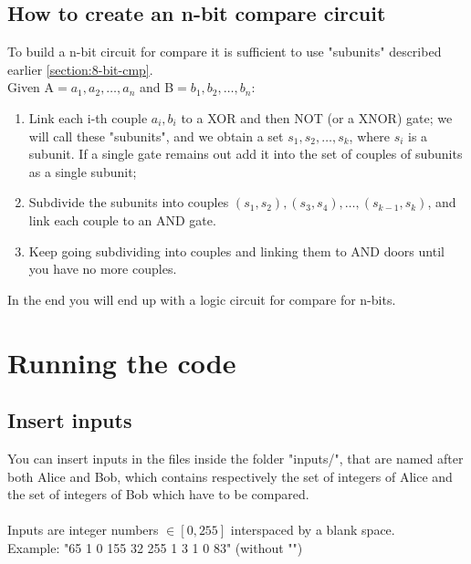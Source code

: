 \documentclass[12pt, letterpaper]{article}
\begin{document}
\subsection{How to create an n-bit compare circuit}
To build a n-bit circuit for compare it is sufficient to use "subunits" described earlier \ref{section:8-bit-cmp}.\\
Given A$=a_1,a_2,\dots,a_n$ and B$=b_1,b_2,\dots,b_n$:
\begin{enumerate}
    \item Link each i-th couple $a_i,b_i$ to a XOR and then NOT (or a XNOR) gate; we will call these "subunits", and we obtain a set $s_1,s_2,\dots,s_k$, where $s_i$ is a subunit. If a single gate remains out add it into the set of couples of subunits as a single subunit;
    \item Subdivide the subunits into couples $(s_1,s_2),(s_3,s_4),\dots,(s_{k-1},s_k)$, and link each couple to an AND gate.
    \item Keep going subdividing into couples and linking them to AND doors until you have no more couples. 
\end{enumerate}
In the end you will end up with a logic circuit for compare for n-bits.

\section{Running the code}
\label{sec:run}
\subsection{Insert inputs}
You can insert inputs in the files inside the folder "inputs/", that are named after both Alice and Bob, which contains respectively the set of integers of Alice and the set of integers of Bob which have to be compared.\\
\\
Inputs are integer numbers $\in [0,255]$ interspaced by a blank space.\\
Example: "65 1 0 155 32 255 1 3 1 0 83" (without "")
\end{document}
